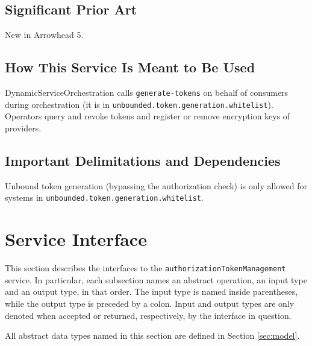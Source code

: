 \documentclass[a4paper]{arrowhead}
\begin{document}
\subsection{Significant Prior Art}

New in Arrowhead 5.

\subsection{How This Service Is Meant to Be Used}

Dynamic\allowbreak{}Service\allowbreak{}Orchestration calls \texttt{generate-\allowbreak{}tokens} on behalf of consumers during orchestration (it is in \texttt{unbounded.\allowbreak{}token.\allowbreak{}generation.\allowbreak{}whitelist}). Operators query and revoke tokens and register or remove encryption keys of providers.

\subsection{Important Delimitations and Dependencies}
\label{sec:delimitations}

Unbound token generation (bypassing the authorization check) is only allowed for systems in \texttt{unbounded.\allowbreak{}token.\allowbreak{}generation.\allowbreak{}whitelist}.

\newpage

\section{Service Interface}
\label{sec:operations}

This section describes the interfaces to the \texttt{authorization\allowbreak{}Token\allowbreak{}Management} service.
In particular, each subsection names an abstract operation, an input type and an output type, in that order.
The input type is named inside parentheses, while the output type is preceded by a colon.
Input and output types are only denoted when accepted or returned, respectively, by the interface in question.

All abstract data types named in this section are defined in Section \ref{sec:model}.
\end{document}
